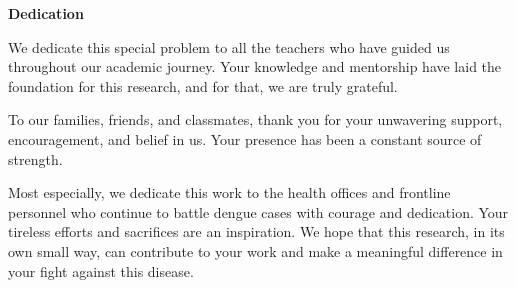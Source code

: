\begin{center}
	\textbf{Dedication}
\end{center}

We dedicate this special problem to all the teachers who have guided us throughout our academic journey. Your knowledge and mentorship have laid the foundation for this research, and for that, we are truly grateful.

To our families, friends, and classmates, thank you for your unwavering support, encouragement, and belief in us. Your presence has been a constant source of strength.

Most especially, we dedicate this work to the health offices and frontline personnel who continue to battle dengue cases with courage and dedication. Your tireless efforts and sacrifices are an inspiration. We hope that this research, in its own small way, can contribute to your work and make a meaningful difference in your fight against this disease.